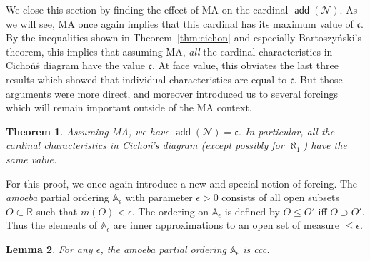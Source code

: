 \documentclass[11pt,oneside]{amsbook}
\newcommand{\RR}{\mathbb R}
\newcommand{\Null}{\mathcal N}
\DeclareMathOperator{\add}{\mathsf{add}}
\theoremstyle{definition}
\theoremstyle{plain}
\newtheorem{thm}{Theorem}[section]
\newtheorem{lem}[thm]{Lemma}
\theoremstyle{definition}
\theoremstyle{remark}
\numberwithin{equation}{section}
\numberwithin{figure}{section}
\begin{document}
We close this section by finding the effect of MA on the cardinal $\add(\Null)$. As we will see, MA once again implies that this cardinal has its maximum value of $\mathfrak c$. By the inequalities shown in Theorem~\ref{thm:cichon} and especially Bartoszy\'nski's theorem, this implies that assuming MA, \emph{all} the cardinal characteristics in Cicho\'n\'s diagram have the value $\mathfrak c$. At face value, this obviates the last three results which showed that individual characteristics are equal to $\mathfrak c$. But those arguments were more direct, and moreover introduced us to several forcings which will remain important outside of the MA context.

\begin{thm}
  \label{thm:ma-addn}
  Assuming MA, we have $\add(\Null)=\mathfrak c$. In particular, all the cardinal characteristics in Cicho\'n's diagram (except possibly for $\aleph_1$) have the same value.
\end{thm}

For this proof, we once again introduce a new and special notion of forcing. The \emph{amoeba} partial ordering $\mathbb A_\epsilon$ with parameter $\epsilon>0$ consists of all open subsets $O\subset\RR$ such that $m(O)<\epsilon$. The ordering on $\mathbb A_\epsilon$ is defined by $O\leq O'$ iff $O\supset O'$. Thus the elements of $\mathbb A_\epsilon$ are inner approximations to an open set of measure $\leq\epsilon$.

\begin{lem}
  For any $\epsilon$, the amoeba partial ordering $\mathbb A_\epsilon$ is ccc.
\end{lem}
\end{document}
